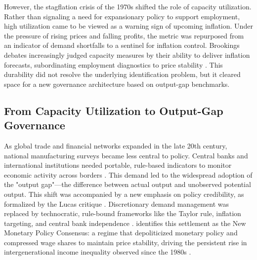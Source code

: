 \documentclass[11pt]{article}
\begin{document}
However, the stagflation crisis of the 1970s shifted the role of capacity utilization. Rather than signaling a need for expansionary policy to support employment, high utilization came to be viewed as a warning sign of upcoming inflation. Under the pressure of rising prices and falling profits, the metric was repurposed from an indicator of demand shortfalls to a sentinel for inflation control. Brookings debates increasingly judged capacity measures by their ability to deliver inflation forecasts, subordinating employment diagnostics to price stability \citep{KleinEtAl1973}. This durability did not resolve the underlying identification problem, but it cleared space for a new governance architecture based on output-gap benchmarks.

\subsection{From Capacity Utilization to Output-Gap Governance}
\label{subsec:output_gap_governance}

As global trade and financial networks expanded in the late 20th century, national manufacturing surveys became less central to policy. Central banks and international institutions needed portable, rule-based indicators to monitor economic activity across borders \citep{Jessop2002, Jessop2003, Konings2007}. This demand led to the widespread adoption of the "output gap"—the difference between actual output and unobserved potential output. This shift was accompanied by a new emphasis on policy credibility, as formalized by the Lucas critique \citep{Johnson2024}. Discretionary demand management was replaced by technocratic, rule-bound frameworks like the Taylor rule, inflation targeting, and central bank independence \citep{Taylor1993, Johnson2024}. \citet{SaadFilho2018} identifies this settlement as the New Monetary Policy Consensus: a regime that depoliticized monetary policy and compressed wage shares to maintain price stability, driving the persistent rise in intergenerational income inequality observed since the 1980s \citep{HickelEtAl2026, Foster2024}.
\end{document}
